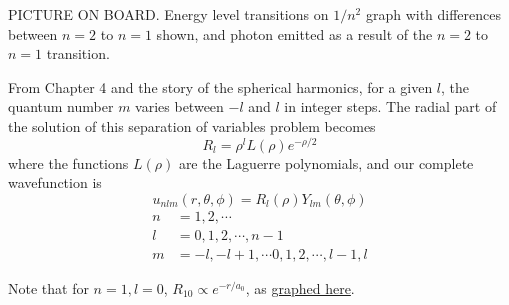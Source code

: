 PICTURE ON BOARD.  Energy level transitions on \(1/n^2\) graph with differences between \(n=2\) to \(n=1\) shown, and photon emitted as a result of the \(n=2\) to \(n=1\) transition.

From Chapter 4 and the story of the spherical harmonics, for a given \(l\), the quantum number \(m\) varies between \(-l\) and \(l\) in integer steps.  The radial part of the solution of this separation of variables problem becomes
%
\begin{equation}\label{eqn:PHY356FLecture10:320}
R_l = \rho^l L(\rho) e^{-\rho/2}
\end{equation}
%
where the functions \(L(\rho)\) are the Laguerre polynomials, and our complete wavefunction is
\begin{equation}\label{eqn:PHY356FLecture10:330}
u_{nlm}(r, \theta, \phi) = R_l(\rho) Y_{lm}(\theta, \phi)
\end{equation}
%
\begin{align}\label{eqn:PHY356FLecture10:340}
n &= 1, 2, \cdots \\
l &= 0, 1, 2, \cdots, n-1 \\
m &= -l, -l+1, \cdots 0, 1, 2, \cdots, l-1, l
\end{align}

Note that for \(n=1, l=0\), \(R_{10} \propto e^{-r/a_0}\), as \href{http://www.wolframalpha.com/input/?i=graph+e^{-r}}{graphed here}.

